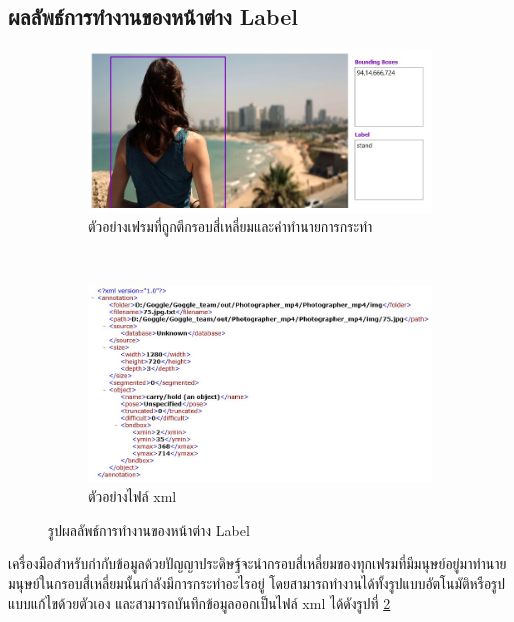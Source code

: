 \subsection*{ผลลัพธ์การทำงานของหน้าต่าง Label}
\begin{figure}[!ht]
    \centering
   \begin{subfigure}[b]{0.65\linewidth}
      \includegraphics[width=\linewidth]{chapter4/images/Result/result_select.jpg}
      \caption{ตัวอย่างเฟรมที่ถูกตีกรอบสี่เหลี่ยมและคำทำนายการกระทำ}
      \label{fig:result_labeled}
    \end{subfigure}
\\
    \begin{subfigure}[b]{0.8\linewidth}
      \includegraphics[width=\linewidth]{chapter4/images/Result/result_select9.jpg}
      \caption{ตัวอย่างไฟล์ xml}
      \label{fig:result_label_xml}
    \end{subfigure}
    \caption{รูปผลลัพธ์การทำงานของหน้าต่าง Label}
    \label{fig:result_label}
  \end{figure}
เครื่องมือสำหรับกำกับข้อมูลด้วยปัญญาประดิษฐ์จะนำกรอบสี่เหลี่ยมของทุกเฟรมที่มีมนุษย์อยู่มาทำนายมนุษย์ในกรอบสี่เหลี่ยมนั้นกำลังมีการกระทำอะไรอยู่ โดยสามารถทำงานได้ทั้งรูปแบบอัตโนมัติหรือรูปแบบแก้ไขด้วยตัวเอง
และสามารถบันทึกข้อมูลออกเป็นไฟล์ xml ได้ดังรูปที่ \ref{fig:result_label_xml}
